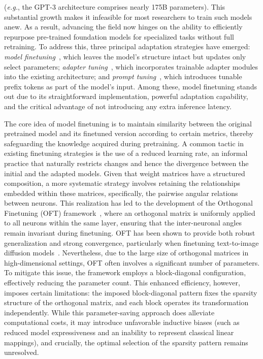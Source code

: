 (\emph{e.g.}, the GPT-3 architecture comprises nearly 175B parameters). This substantial growth makes it infeasible for most researchers to train such models anew. As a result, advancing the field now hinges on the ability to efficiently repurpose pre-trained foundation models for specialized tasks without full retraining. To address this, three principal adaptation strategies have emerged: \emph{model finetuning}~\cite{hulora2022,zaken2022bitfit,guo2020parameter,raffel2020exploring,qiu2023controlling,zhang2022adaptive,chavan2023one}, which leaves the model’s structure intact but updates only select parameters; \emph{adapter tuning}~\cite{rebuffi2017learning,houlsby2019parameter,pfeiffer2020adapterfusion,lin2020exploring,he2021towards}, which incorporates trainable adapter modules into the existing architecture; and \emph{prompt tuning}~\cite{li2021prefix,lester2021power}, which introduces tunable prefix tokens as part of the model’s input. Among these, model finetuning stands out due to its straightforward implementation, powerful adaptation capability, and the critical advantage of not introducing any extra inference latency.

The core idea of model finetuning is to maintain similarity between the original pretrained model and its finetuned version according to certain metrics, thereby safeguarding the knowledge acquired during pretraining. A common tactic in existing finetuning strategies is the use of a reduced learning rate, an informal practice that naturally restricts changes and hence the divergence between the initial and the adapted models. Given that weight matrices have a structured composition, a more systematic strategy involves retaining the relationships embedded within these matrices, specifically, the pairwise angular relations between neurons. This realization has led to the development of the Orthogonal Finetuning (OFT) framework~\cite{qiu2023controlling}, where an orthogonal matrix is uniformly applied to all neurons within the same layer, ensuring that the inter-neuronal angles remain invariant during finetuning. OFT has been shown to provide both robust generalization and strong convergence, particularly when finetuning text-to-image diffusion models~\cite{qiu2023controlling}. Nevertheless, due to the large size of orthogonal matrices in high-dimensional settings, OFT often involves a significant number of parameters. To mitigate this issue, the framework employs a block-diagonal configuration, effectively reducing the parameter count. This enhanced efficiency, however, imposes certain limitations: the imposed block-diagonal pattern fixes the sparsity structure of the orthogonal matrix, and each block operates its transformation independently. While this parameter-saving approach does alleviate computational costs, it may introduce unfavorable inductive biases (such as reduced model expressiveness and an inability to represent classical linear mappings), and crucially, the optimal selection of the sparsity pattern remains unresolved.

